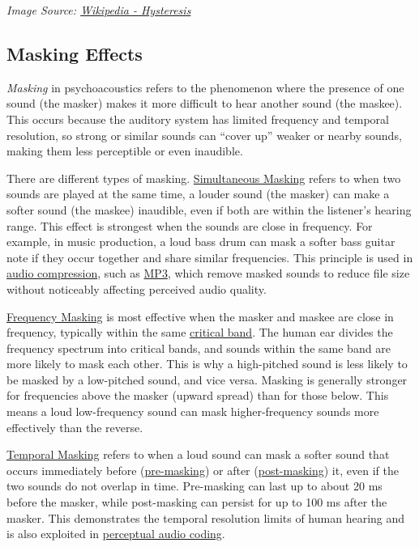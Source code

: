 \documentclass{article}
\begin{document}
\textit{Image Source: \href{https://en.wikipedia.org/wiki/Hysteresis}{Wikipedia - Hysteresis}}

\subsection{Masking Effects}

\textit{Masking} in psychoacoustics refers to the phenomenon where the presence of one sound (the masker) makes it more difficult to hear another sound (the maskee). This occurs because the auditory system has limited frequency and temporal resolution, so strong or similar sounds can ``cover up'' weaker or nearby sounds, making them less perceptible or even inaudible.

There are different types of masking. \href{https://en.wikipedia.org/wiki/Masking\_(psychophysics)\#Simultaneous\_masking}{Simultaneous Masking} refers to when two sounds are played at the same time, a louder sound (the masker) can make a softer sound (the maskee) inaudible, even if both are within the listener's hearing range. This effect is strongest when the sounds are close in frequency. For example, in music production, a loud bass drum can mask a softer bass guitar note if they occur together and share similar frequencies. This principle is used in \href{https://en.wikipedia.org/wiki/Audio\_compression\_(data)}{audio compression}, such as \href{https://en.wikipedia.org/wiki/MP3}{MP3}, which remove masked sounds to reduce file size without noticeably affecting perceived audio quality.

\href{https://en.wikipedia.org/wiki/Masking\_(psychophysics)\#Frequency\_masking}{Frequency Masking} is most effective when the masker and maskee are close in frequency, typically within the same \href{https://en.wikipedia.org/wiki/Critical\_band}{critical band}. The human ear divides the frequency spectrum into critical bands, and sounds within the same band are more likely to mask each other. This is why a high-pitched sound is less likely to be masked by a low-pitched sound, and vice versa. Masking is generally stronger for frequencies above the masker (upward spread) than for those below. This means a loud low-frequency sound can mask higher-frequency sounds more effectively than the reverse.

\href{https://en.wikipedia.org/wiki/Masking\_(psychophysics)\#Temporal\_masking}{Temporal Masking} refers to when a loud sound can mask a softer sound that occurs immediately before (\href{https://en.wikipedia.org/wiki/Masking\_(psychophysics)\#Pre-masking}{pre-masking}) or after (\href{https://en.wikipedia.org/wiki/Masking\_(psychophysics)\#Post-masking}{post-masking}) it, even if the two sounds do not overlap in time. Pre-masking can last up to about 20 ms before the masker, while post-masking can persist for up to 100 ms after the masker. This demonstrates the temporal resolution limits of human hearing and is also exploited in \href{https://en.wikipedia.org/wiki/Perceptual\_coding}{perceptual audio coding}.
\end{document}
